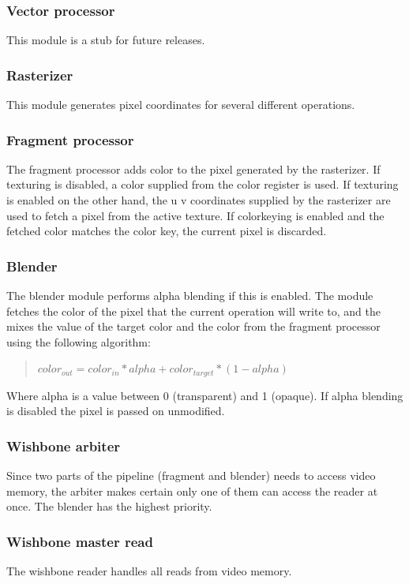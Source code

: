 \documentclass[10pt,a4paper]{article}
\begin{document}
\subsubsection{Vector processor}
This module is a stub for future releases.

\subsubsection{Rasterizer}
This module generates pixel coordinates for several different operations.

\subsubsection{Fragment processor}
The fragment processor adds color to the pixel generated by the rasterizer. If texturing is disabled, a color supplied from the color register is used. If texturing is enabled on the other hand, the u v coordinates supplied by the rasterizer are used to fetch a pixel from the active texture. If colorkeying is enabled and the fetched color matches the color key, the current pixel is discarded.

\subsubsection{Blender}
The blender module performs alpha blending if this is enabled. The module fetches the color of the pixel that the current operation will write to, and the mixes the value of the target color and the color from the fragment processor using the following algorithm:

\begin{quote}
$ color_{out} = color_{in} * alpha + color_{target} * (1 - alpha) $
\end{quote}

Where alpha is a value between 0 (transparent) and 1 (opaque). If alpha blending is disabled the pixel is passed on unmodified.

\subsubsection{Wishbone arbiter}
Since two parts of the pipeline (fragment and blender) needs to access video memory, the arbiter makes certain only one of them can access the reader at once. The blender has the highest priority.

\subsubsection{Wishbone master read}
The wishbone reader handles all reads from video memory.
\end{document}
